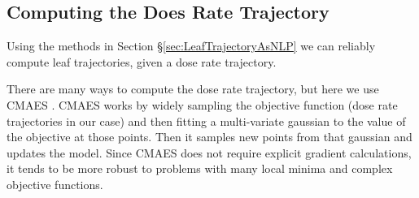 
\subsection{Computing the Does Rate Trajectory}

Using the methods in Section \S \ref{sec:LeafTrajectoryAsNLP} we can reliably compute leaf
trajectories, given a dose rate trajectory.

There are many ways to compute the dose rate trajectory, but here we use CMAES \cite{Hansen2001}.
CMAES works by widely sampling the objective function (dose rate trajectories in our case) and then
fitting a multi-variate gaussian to the value of the objective at those points.
Then it samples new points from that gaussian and updates the model.
Since CMAES does not require explicit gradient calculations, it tends to be more robust to problems
with many local minima and complex objective functions.

